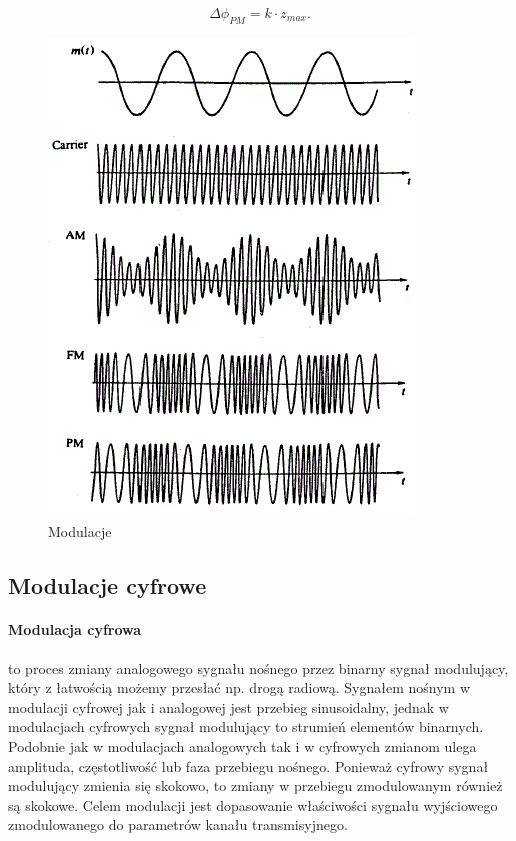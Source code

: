 \documentclass[a4paper,twoside]{report}
\begin{document}
\begin{equation}
\Delta \phi _{PM}= k\cdot z_{max}.
\end{equation}



\begin{figure}[htbp]
\centering
\includegraphics[scale=1]{obrazy/modulacje.png}
\caption{Modulacje}
\label{rys:modulacje}
\end{figure}

 
\subsection{Modulacje cyfrowe}
\paragraph{Modulacja cyfrowa} to proces zmiany analogowego sygnału nośnego przez binarny sygnał modulujący, który z łatwością możemy przesłać np. drogą radiową. Sygnałem nośnym w modulacji cyfrowej jak i analogowej jest przebieg sinusoidalny, jednak w modulacjach cyfrowych sygnał modulujący to strumień elementów binarnych. Podobnie jak w modulacjach analogowych tak i w cyfrowych zmianom ulega amplituda, częstotliwość lub faza przebiegu nośnego. Ponieważ cyfrowy sygnał modulujący zmienia się skokowo, to zmiany w przebiegu zmodulowanym również są skokowe. Celem modulacji jest dopasowanie właściwości sygnału wyjściowego zmodulowanego do parametrów kanału transmisyjnego.
\end{document}
